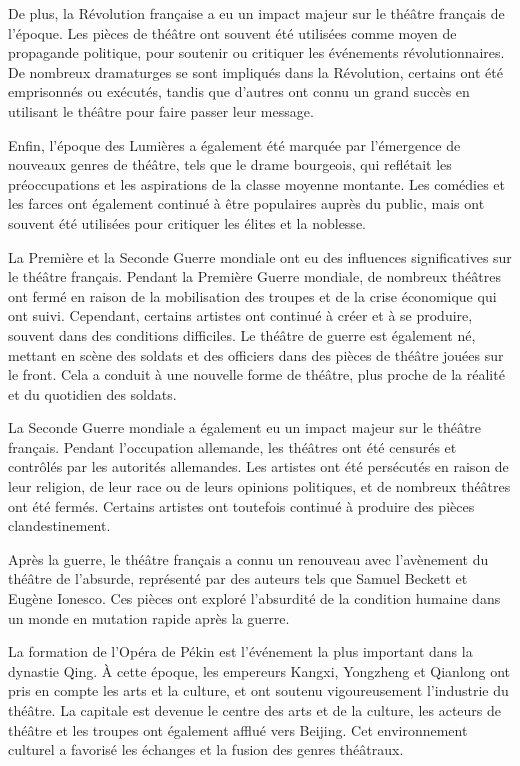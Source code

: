\documentclass[UTF8,a4paper,12pt]{ctexart}
\numberwithin{equation}{section}
\newcommand{\mycite}[1]{\cite{#1}}
\begin{document}
De plus, la Révolution française a eu un impact majeur sur le théâtre français de l'époque. Les pièces de théâtre ont souvent été utilisées comme moyen de propagande politique, pour soutenir ou critiquer les événements révolutionnaires. De nombreux dramaturges se sont impliqués dans la Révolution, certains ont été emprisonnés ou exécutés, tandis que d'autres ont connu un grand succès en utilisant le théâtre pour faire passer leur message.

Enfin, l'époque des Lumières a également été marquée par l'émergence de nouveaux genres de théâtre, tels que le drame bourgeois, qui reflétait les préoccupations et les aspirations de la classe moyenne montante. Les comédies et les farces ont également continué à être populaires auprès du public, mais ont souvent été utilisées pour critiquer les élites et la noblesse.


La Première et la Seconde Guerre mondiale ont eu des influences significatives sur le théâtre français.
Pendant la Première Guerre mondiale, de nombreux théâtres ont fermé en raison de la mobilisation des troupes et de la crise économique qui ont suivi. Cependant, certains artistes ont continué à créer et à se produire, souvent dans des conditions difficiles. Le théâtre de guerre est également né, mettant en scène des soldats et des officiers dans des pièces de théâtre jouées sur le front. Cela a conduit à une nouvelle forme de théâtre, plus proche de la réalité et du quotidien des soldats.

La Seconde Guerre mondiale a également eu un impact majeur sur le théâtre français. Pendant l'occupation allemande, les théâtres ont été censurés et contrôlés par les autorités allemandes. Les artistes ont été persécutés en raison de leur religion, de leur race ou de leurs opinions politiques, et de nombreux théâtres ont été fermés. Certains artistes ont toutefois continué à produire des pièces clandestinement.

Après la guerre, le théâtre français a connu un renouveau avec l'avènement du théâtre de l'absurde, représenté par des auteurs tels que Samuel Beckett et Eugène Ionesco. Ces pièces ont exploré l'absurdité de la condition humaine dans un monde en mutation rapide après la guerre.


La formation de l'Opéra de Pékin est l'événement la plus important dans la dynastie Qing. À cette époque, les empereurs Kangxi, Yongzheng et Qianlong ont pris en compte les arts et la culture, et ont soutenu vigoureusement l'industrie du théâtre. La capitale est devenue le centre des arts et de la culture, les acteurs de théâtre et les troupes ont également afflué vers Beijing. Cet environnement culturel a favorisé les échanges et la fusion des genres théâtraux\mycite{15}.
\end{document}
